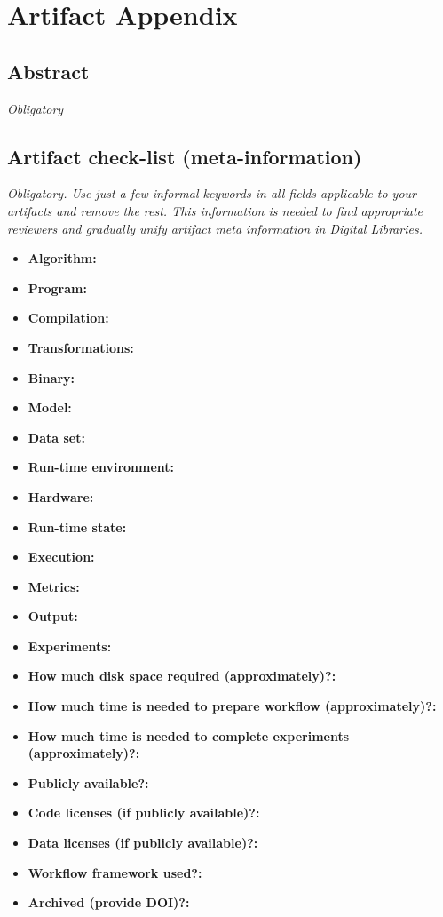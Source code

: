 \documentclass{sigplanconf}
\begin{document}


\appendix
\section{Artifact Appendix}

\subsection{Abstract}

{\em Obligatory}

\subsection{Artifact check-list (meta-information)}

{\em Obligatory. Use just a few informal keywords in all fields applicable to your artifacts
and remove the rest. This information is needed to find appropriate reviewers and gradually 
unify artifact meta information in Digital Libraries.}

{\small
\begin{itemize}
  \item {\bf Algorithm: }
  \item {\bf Program: }
  \item {\bf Compilation: }
  \item {\bf Transformations: }
  \item {\bf Binary: }
  \item {\bf Model: }
  \item {\bf Data set: }
  \item {\bf Run-time environment: }
  \item {\bf Hardware: }
  \item {\bf Run-time state: }
  \item {\bf Execution: }
  \item {\bf Metrics: }
  \item {\bf Output: }
  \item {\bf Experiments: }
  \item {\bf How much disk space required (approximately)?: }
  \item {\bf How much time is needed to prepare workflow (approximately)?: }
  \item {\bf How much time is needed to complete experiments (approximately)?: }
  \item {\bf Publicly available?: }
  \item {\bf Code licenses (if publicly available)?: }
  \item {\bf Data licenses (if publicly available)?: }
  \item {\bf Workflow framework used?: }
  \item {\bf Archived (provide DOI)?: }
\end{itemize}
}
\end{document}
